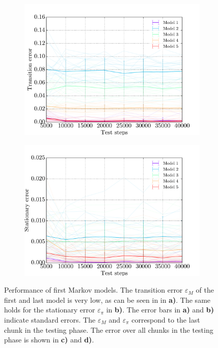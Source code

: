 \begin{figure}[p]
\begin{subfigure}{0.48\textwidth}
    	\centering
        \includegraphics[width=\textwidth]{results/mc1_test_traces_distances}
        \caption{}
        \label{fig:mc1-test_traces-transition}
    \end{subfigure}
    \hfill
    \begin{subfigure}{0.48\textwidth}
    	\centering
        \includegraphics[width=\textwidth]{results/mc1_test_traces_stationary}
        \caption{}
        \label{fig:mc1-test_traces-stationary}
    \end{subfigure}
    \caption[Performance of first Markov models]{Performance of first Markov models. The transition error $\varepsilon_M$ of the first and last model is very low, as can be seen in in \textbf{a)}. The same holds for the stationary error $\varepsilon_\pi$ in \textbf{b)}. The error bars in \textbf{a)} and \textbf{b)} indicate standard errors. The $\varepsilon_M$ and $\varepsilon_\pi$ correspond to the last chunk in the testing phase. The error over all chunks in the testing phase is shown in \textbf{c)} and \textbf{d)}.}
    \label{fig:mc1-performance}
\end{figure}

